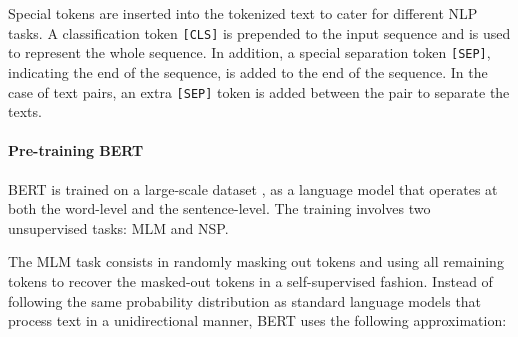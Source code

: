 
Special tokens are inserted into the tokenized text to cater for different \ac{NLP} tasks. A classification token \texttt{[CLS]} is prepended to the input sequence and is used to represent the whole sequence. In addition, a special separation token \texttt{[SEP]}, indicating the end of the sequence, is added to the end of the sequence. In the case of text pairs, an extra \texttt{[SEP]} token is added between the pair to separate the texts. 

\paragraph{Pre-training BERT}

\ac{BERT} is trained on a large-scale dataset \citep{zhu2015aligning}, as a language model that operates at both the word-level and the sentence-level. The training involves two unsupervised tasks: \ac{MLM} and \ac{NSP}. 

The \ac{MLM} task consists in randomly masking out tokens and using all remaining tokens to recover the masked-out tokens in a self-supervised fashion. Instead of following the same probability distribution as standard language models that process text in a unidirectional manner, \ac{BERT} uses the following approximation:

